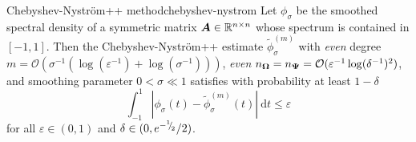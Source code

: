 \documentclass[12pt]{article}
\begin{document}
\begin{theorem}{Chebyshev-Nyström++ method}{chebyshev-nystrom}
    Let $\phi_{\sigma}$ be the smoothed spectral density of a symmetric matrix $\boldsymbol{A} \in \mathbb{R}^{n \times n}$ whose spectrum is contained in $[-1, 1]$. Then the Chebyshev-Nyström++ estimate $\widetilde{\phi}_{\sigma}^{(m)}$ with \emph{even} degree $m = \mathcal{O}(\sigma^{-1}(\log(\varepsilon^{-1}) + \log(\sigma^{-1})))$, \emph{even} $n_{\boldsymbol{\Omega}} = n_{\boldsymbol{\Psi}} = \mathcal{O}(\varepsilon^{-1}\log(\delta^{-1})^2)$, and smoothing parameter $0 < \sigma \ll 1$ satisfies with probability at least $1 - \delta$
    \begin{equation}
        \int_{-1}^{1} \left| \phi_{\sigma}(t) - \widetilde{\phi}_{\sigma}^{(m)}(t) \right|~\mathrm{d}t \leq \varepsilon
        \label{equ:chebyshev-nystrom-error}
    \end{equation}
    for all $\varepsilon \in (0, 1)$ and $\delta \in (0, e^{-{}^{1}{\mskip -5mu/\mskip -3mu}_{2}}/2)$.
\end{theorem}
\end{document}
